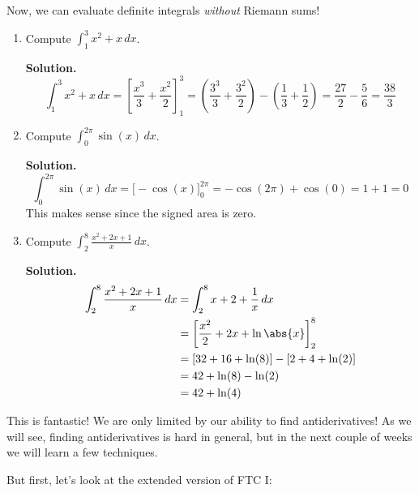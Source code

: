 Now, we can evaluate definite integrals \emph{without} Riemann sums!

\begin{Example}{}{}
    \begin{enumerate}[label=(\roman*)]
        \item Compute $ \displaystyle \int_{1}^{3} x^2+x\, d{x} $.

              \textbf{Solution.}
              \[
                  \int_{1}^{3} x^2+x\, d{x}
                  =\left[\frac{x^3}{3}+\frac{x^2}{2}\right]_{1}^3
                  = \left( \frac{3^3}{3} +\frac{3^2}{2} \right)-\left( \frac{1}{3}+\frac{1}{2} \right)
                  =\frac{27}{2} -\frac{5}{6}
                  =\frac{38}{3}
              \]
        \item Compute $ \displaystyle  \int_{0}^{2\pi} \sin(x)\, d{x} $.

              \textbf{Solution.}
              \[
                  \int_{0}^{2\pi} \sin(x)\, d{x}
                  =\bigl[-\cos(x)\bigr]_0^{2\pi}
                  =-\cos(2\pi)+\cos(0)
                  =1+1
                  =0
              \]
              This makes sense since the signed area is zero.
        \item Compute $
                  \displaystyle \int_{2}^{8} \frac{x^2+2x+1}{x} \, d{x} $.

              \textbf{Solution.}
              \begin{align*}
                  \int_{2}^{8} \frac{x^2+2x+1}{x} \, d{x}
                   & =\int_{2}^{8} x+2+\frac{1}{x}\, d{x}              \\
                   & =\left[\frac{x^2}{2} +2x+\ln\abs{x} \right]_{2}^8 \\
                   & =[32+16+\ln(8)]-[2+4+\ln(2)]                      \\
                   & =42+\ln(8)-\ln(2)                                 \\
                   & =42+\ln(4)
              \end{align*}
    \end{enumerate}
\end{Example}

This is fantastic! We are only limited by our ability to find antiderivatives!
As we will see, finding antiderivatives is hard in general, but in the next couple of
weeks we will learn a few techniques.

But first, let's look at the extended version of FTC I\@:

